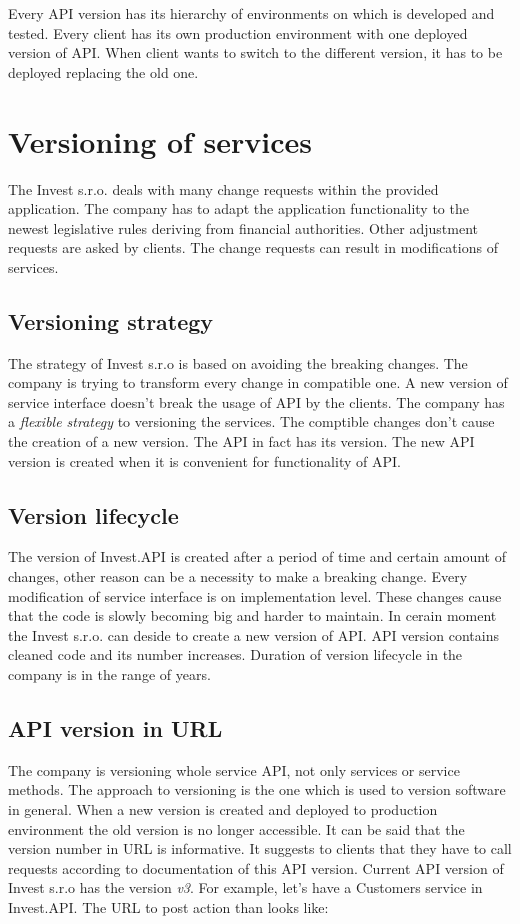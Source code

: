 Every API version has its hierarchy of environments on which is developed and tested. Every client has its own production environment with one deployed version of API. When client wants to switch to the different version, it has to be deployed replacing the old one.


\section{Versioning of services}
The Invest s.r.o. deals with many change requests within the provided application. The company has to adapt the application functionality to the newest legislative rules deriving from financial authorities. Other adjustment requests are asked by clients. The change requests can result in modifications of services.

\subsection{Versioning strategy}
The strategy of Invest s.r.o is based on avoiding the breaking changes. The company is trying to transform every change in compatible one. A new version of service interface doesn't break the usage of API by the clients. The company has a \emph{flexible strategy} to versioning the services. The comptible changes don't cause the creation of a new version.
The API in fact has its version. The new API version is created when it is convenient for functionality of API.
 

\subsection{Version lifecycle}
The version of Invest.API is created after a period of time and certain amount of changes, other reason can be a necessity to make a breaking change. Every modification of service interface is on implementation level. These changes cause that the code is slowly becoming big and harder to maintain. In cerain moment the Invest s.r.o. can deside to create a new version of API. API version contains cleaned code and its number increases.  Duration of version lifecycle in the company is in the range of years. 
 
\subsection{API version in URL}
The company is versioning whole service API, not only services or service methods. The approach to versioning is the one which is used to version software in general. When a new version is created and deployed to production environment the old version is no longer accessible. It can be said that the version number in URL is informative. It suggests to clients that they have to call requests according to \gls{documentation} of this API version. Current API version of Invest s.r.o has the version \emph{v3}. For example, let's have a Customers service in Invest.API. The URL to post action than looks like:

